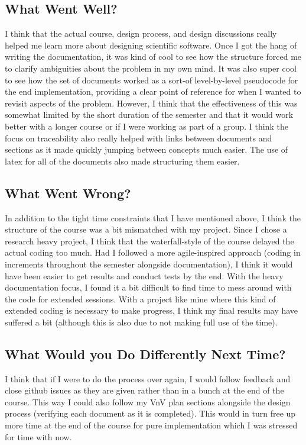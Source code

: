 \documentclass{article}
\begin{document}
\subsection{What Went Well?}

I think that the actual course, design process, and design discussions really helped me learn more about designing scientific software. Once I got the hang of 
writing the documentation, it was kind of cool to see how the structure forced me to clarify ambiguities about the problem in my own mind. It was also super cool to 
see how the set of documents worked as a sort-of level-by-level pseudocode for the end implementation, providing a clear point of reference for when I wanted to revisit aspects of the problem. 
However, I think that the effectiveness of this was somewhat limited by the short duration of the semester and that it would work better with a longer course or if I were working as part of a group. 
I think the focus on traceability also really helped with links between documents and sections as it made quickly jumping between concepts much easier. The use of latex for all of the documents also made 
structuring them easier.

\subsection{What Went Wrong?}

In addition to the tight time constraints that I have mentioned above, I think the structure of the course was a bit mismatched with my project. 
Since I chose a research heavy project, I think that the waterfall-style of the course delayed the actual coding too much. Had I followed a more agile-inspired 
approach (coding in increments throughout the semester alongside documentation), I think it would have been easier to get results and conduct tests by the end.
With the heavy documentation focus, I found it a bit difficult to find time to mess around with the code for extended sessions. With a project like mine where 
this kind of extended coding is necessary to make progress, I think my final results may have suffered a bit (although this is also due to not making full use of the time).

\subsection{What Would you Do Differently Next Time?}
I think that if I were to do the process over again, I would follow feedback and close github issues 
as they are given rather than in a bunch at the end of the course. This way I could also follow my VnV plan sections alongside 
the design process (verifying each document as it is completed). This would in turn free up more time at the end of the course for 
pure implementation which I was stressed for time with now.
\end{document}
